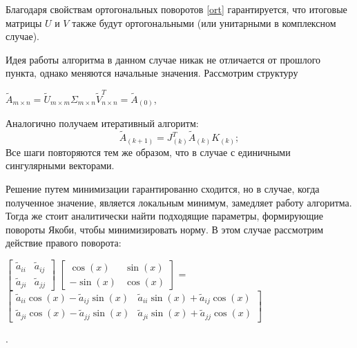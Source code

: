\begin{note}
    Благодаря свойствам ортогональных поворотов \eqref{ort} гарантируется, что итоговые матрицы $U$ и $V$ также будут ортогональными (или унитарными в комплексном случае). 
\end{note}



Идея работы алгоритма в данном случае никак не отличается от прошлого пункта, однако меняются начальные значения. Рассмотрим структуру 
\begin{center}
    $\tilde{A}_{m \times n} = \tilde{U}_{m\times m}\Sigma_{m\times n}\tilde{V}^T_{n \times n} = \tilde{A}_{(0)}$,
\end{center}
Аналогично получаем итеративный алгоритм:
\begin{equation}
    \tilde{A}_{(k+1)}= J^T_{(k)}\tilde{A}_{(k)}K_{(k)};
\end{equation}
Все шаги повторяются тем же образом, что в случае с единичными сингулярными векторами.

Решение путем минимизации гарантированно сходится, но в случае, когда полученное значение, является локальным минимум, замедляет работу алгоритма. Тогда же стоит аналитически найти подходящие параметры, формирующие повороты Якоби, чтобы минимизировать норму. В этом случае рассмотрим действие правого поворота: \begin{center}
    $\left[\begin{matrix}\tilde{a}_{ii} & \tilde{a}_{ij}\\\tilde{a}_{ji} & \tilde{a}_{jj}\end{matrix}\right]$
    $\left[\begin{matrix}\cos{\left(x \right)} & \sin{\left(x \right)}\\- \sin{\left(x \right)} & \cos{\left(x \right)}\end{matrix}\right]$
    =
    $\left[\begin{matrix}\tilde{a}_{ii} \cos{\left(x \right)} - \tilde{a}_{ij} \sin{\left(x \right)} & \tilde{a}_{ii} \sin{\left(x \right)} + \tilde{a}_{ij} \cos{\left(x \right)}\\ \tilde{a}_{ji} \cos{\left(x \right)} - \tilde{a}_{jj} \sin{\left(x \right)} & \tilde{a}_{ji} \sin{\left(x \right)} + \tilde{a}_{jj} \cos{\left(x \right)}\end{matrix}\right]$
\end{center}.

